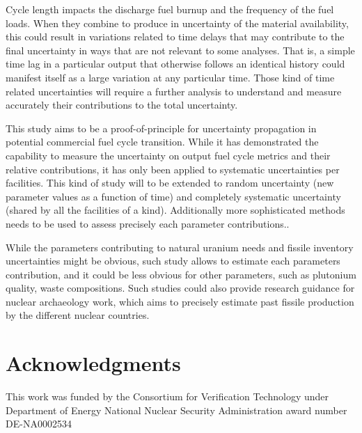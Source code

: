 \documentclass{anstrans}
\begin{document}
Cycle length impacts the discharge fuel burnup and the frequency of the fuel
loads.  When they combine to produce in uncertainty of the material
availability, this could result in variations related to time delays that may
contribute to the final uncertainty in ways that are not relevant to some
analyses.  That is, a simple time lag in a particular output that otherwise
follows an identical history could manifest itself as a large variation at any
particular time.  Those kind of time related uncertainties will require a
further analysis to understand and measure accurately their contributions to the
total uncertainty.

This study aims to be a proof-of-principle for uncertainty propagation in
potential commercial fuel cycle transition.  While it has demonstrated the
capability to measure the uncertainty on output fuel cycle metrics and their
relative contributions, it has only been applied to systematic uncertainties per
facilities.  This kind of study will to be extended to random uncertainty (new
parameter values as a function of time) and completely systematic uncertainty
(shared by all the facilities of a kind). Additionally more sophisticated methods needs to
be used to assess precisely each parameter contributions..

While the parameters contributing to natural uranium needs and fissile inventory
uncertainties might be obvious, such study allows to estimate each parameters
contribution, and it could be less obvious for other parameters, such as
plutonium quality, waste compositions.  Such studies could also provide research
guidance for nuclear archaeology work, which aims to precisely estimate past
fissile production by the different nuclear countries.




\section{Acknowledgments}
This work was funded by the Consortium for Verification Technology under
Department of Energy National Nuclear Security Administration award number
DE-NA0002534



\end{document}

